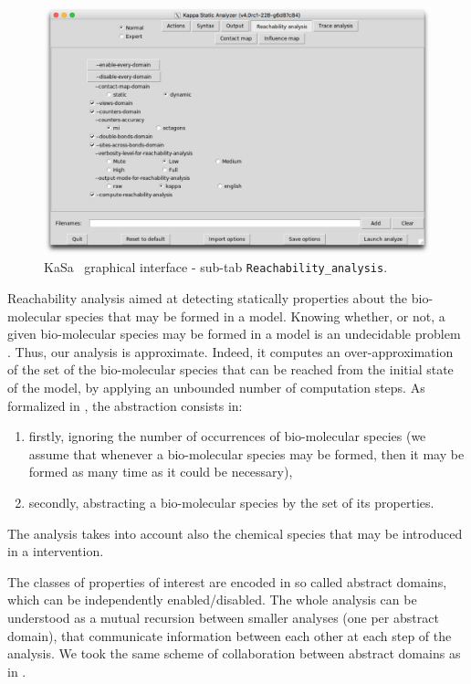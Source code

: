 \documentclass[11pt]{book}
\def\KaSa{\textsf{KaSa}}
\begin{document}
\begin{figure}[htbp]
\centering
\includegraphics[width=12cm]{img/kasa_3.png}
\caption{\KaSa~ graphical interface - sub-tab \texttt{Reachability\_analysis}.}
\label{fig:kasa:2}
\end{figure}

Reachability analysis aimed at detecting statically properties about the bio-molecular species that may be formed in a model.
Knowing whether, or not, a given bio-molecular species may be formed in a model is an undecidable problem \cite{Kreyssig}. Thus, our analysis is approximate. Indeed, it computes an over-approximation of the set of the bio-molecular species that can be reached from the initial state of the model, by applying an unbounded number of computation steps. As formalized in \cite{DanosEtAl-VMCAI08,Feret:SASB2016}, the abstraction consists in:
\begin{enumerate}
\item firstly, ignoring the number of occurrences of bio-molecular species (we assume that whenever a bio-molecular species may be formed, then it may be formed as many time as it could be necessary),
\item secondly, abstracting a bio-molecular species by the set of its properties.
\end{enumerate}
The analysis takes into account also the chemical species that may be introduced in a intervention.

The classes of properties of interest are encoded in so called abstract domains, which can be independently enabled/disabled. The whole analysis can be understood as a mutual recursion between smaller analyses (one per abstract domain), that communicate information between each other at each step of the analysis. We took the same scheme of collaboration between abstract domains as in  \cite{CousotEtAl06-ASIAN}.
\end{document}
